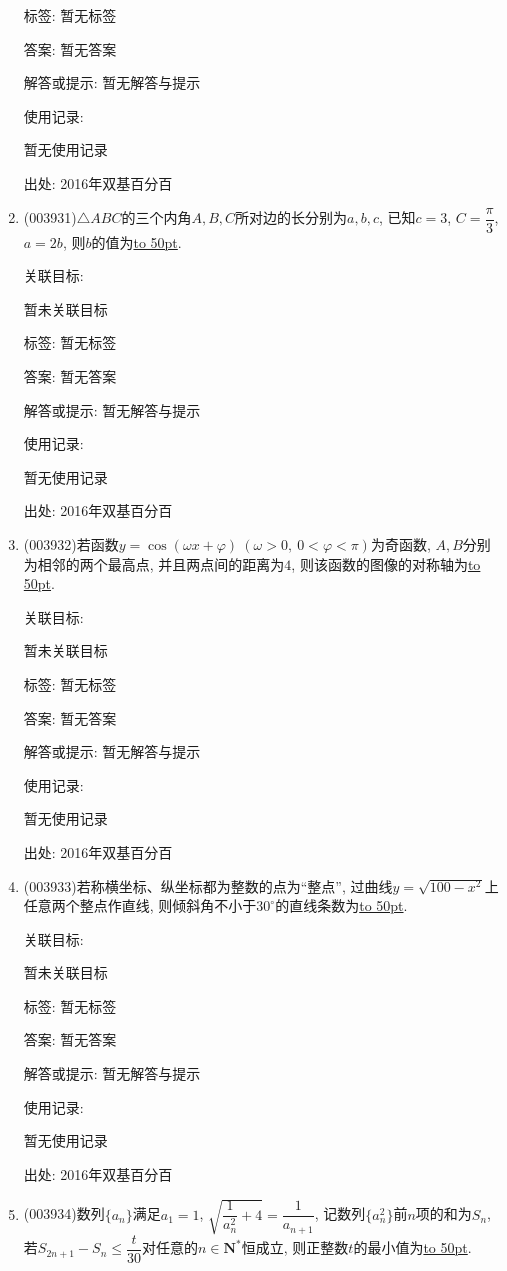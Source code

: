 \documentclass[10pt,a4paper]{article}
\newcommand{\blank}[1]{\underline{\hbox to #1pt{}}}
\begin{document}
\begin{enumerate}[1.]
标签: 暂无标签

答案: 暂无答案

解答或提示: 暂无解答与提示

使用记录:

暂无使用记录


出处: 2016年双基百分百
\item { (003931)}$\triangle ABC$的三个内角$A,B,C$所对边的长分别为$a,b,c$, 已知$c=3$, $C=\dfrac{\pi}{3}$, $a=2b$, 则$b$的值为\blank{50}.


关联目标:

暂未关联目标



标签: 暂无标签

答案: 暂无答案

解答或提示: 暂无解答与提示

使用记录:

暂无使用记录


出处: 2016年双基百分百
\item { (003932)}若函数$y=\cos(\omega x+\varphi) \ (\omega>0, \ 0<\varphi<\pi)$为奇函数, $A,B$分别为相邻的两个最高点, 并且两点间的距离为$4$, 则该函数的图像的对称轴为\blank{50}.


关联目标:

暂未关联目标



标签: 暂无标签

答案: 暂无答案

解答或提示: 暂无解答与提示

使用记录:

暂无使用记录


出处: 2016年双基百分百
\item { (003933)}若称横坐标、纵坐标都为整数的点为``整点'', 过曲线$y=\sqrt{100-x^2}$上任意两个整点作直线, 则倾斜角不小于$30^\circ$的直线条数为\blank{50}.


关联目标:

暂未关联目标



标签: 暂无标签

答案: 暂无答案

解答或提示: 暂无解答与提示

使用记录:

暂无使用记录


出处: 2016年双基百分百
\item { (003934)}数列$\{a_n\}$满足$a_1=1$, $\sqrt{\dfrac{1}{a_n^2}+4}=\dfrac{1}{a_{n+1}}$, 记数列$\{a_n^2\}$前$n$项的和为$S_n$, 若$S_{2n+1}-S_n\le \dfrac t{30}$对任意的$n\in \mathbf{N}^*$恒成立, 则正整数$t$的最小值为\blank{50}.



\end{enumerate}
\end{document}
